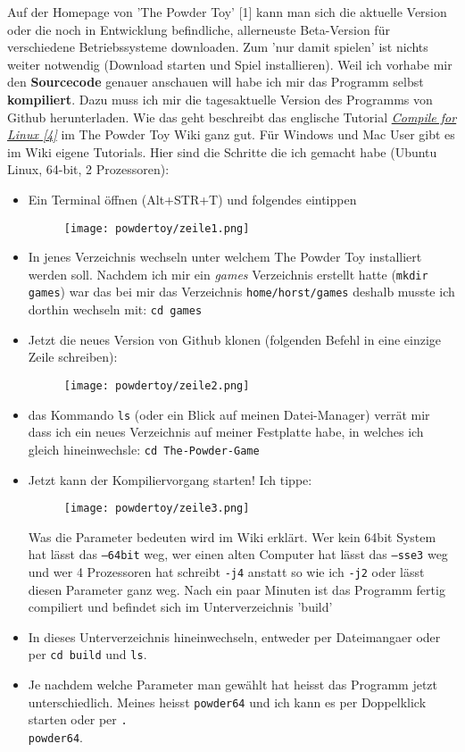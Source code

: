 \documentclass[10pt,a4paper,ngerman,twoside]{article} %
\begin{document}
Auf der Homepage von 'The Powder Toy' [1] kann man sich die aktuelle Version oder die noch in Entwicklung befindliche, allerneuste Beta-Version für verschiedene Betriebssysteme downloaden. Zum 'nur damit spielen' ist nichts weiter notwendig (Download starten und Spiel installieren). Weil ich vorhabe mir den \textbf{Sourcecode} genauer anschauen will habe ich mir das Programm selbst \textbf{kompiliert}. Dazu muss ich mir die tagesaktuelle Version des Programms von Github herunterladen. Wie das geht beschreibt das englische Tutorial \href{http://goo.gl/LK4z01}{\textit{Compile for Linux [4]}} im The Powder Toy Wiki ganz gut. Für Windows und Mac User gibt es im Wiki eigene Tutorials. Hier sind die Schritte die ich gemacht habe (Ubuntu Linux, 64-bit, 2 Prozessoren):

\begin{itemize}
\item Ein Terminal öffnen (Alt+STR+T) und folgendes eintippen 
\begin{figure}
\texttt{[image: powdertoy/zeile1.png]}
\end{figure}
\item In jenes Verzeichnis wechseln unter welchem The Powder Toy installiert werden soll. Nachdem ich mir ein \textit{games} Verzeichnis erstellt hatte (\texttt{mkdir games}) war das bei mir das Verzeichnis \texttt{home/horst/games} deshalb musste ich dorthin wechseln mit: \texttt{cd games}  
\item Jetzt die neues Version von Github klonen (folgenden Befehl in eine einzige Zeile schreiben):
\begin{figure}
\texttt{[image: powdertoy/zeile2.png]}
\end{figure}
\item das Kommando \texttt{ls} (oder ein Blick auf meinen Datei-Manager) verrät mir dass ich ein neues Verzeichnis auf meiner Festplatte habe, in welches ich gleich hineinwechsle: \texttt{cd The-Powder-Game}
\item Jetzt kann der Kompiliervorgang starten! Ich tippe:
\begin{figure}
\texttt{[image: powdertoy/zeile3.png]}
\end{figure} Was die Parameter bedeuten wird im Wiki erklärt. Wer kein 64bit System hat lässt das \texttt{--64bit} weg, wer einen alten Computer hat lässt das \texttt{--sse3} weg und wer 4 Prozessoren hat schreibt \texttt{-j4} anstatt so wie ich \texttt{-j2} oder lässt diesen Parameter ganz weg. Nach ein paar Minuten ist das Programm fertig compiliert und befindet sich im Unterverzeichnis 'build'
\item In dieses Unterverzeichnis hineinwechseln, entweder per Dateimangaer oder per \texttt{cd build} und \texttt{ls}.
\item Je nachdem welche Parameter man gewählt hat heisst das Programm jetzt unterschiedlich. Meines heisst \texttt{powder64} und ich kann es per Doppelklick starten oder per \texttt{.\\powder64}.
\end{itemize}
\end{document}
